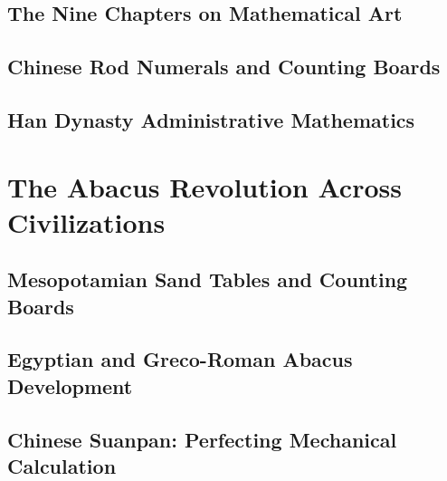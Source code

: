 \documentclass[12pt, oneside, openany]{book}
\let\oldchapter\chapter
\renewcommand{\chapter}{
	\cleardoublepage
	\thispagestyle{chapter}
	\oldchapter
}
\begin{document}
\section{The Nine Chapters on Mathematical Art}

\section{Chinese Rod Numerals and Counting Boards}

\section{Han Dynasty Administrative Mathematics}


\chapter{The Abacus Revolution Across Civilizations}

\section{Mesopotamian Sand Tables and Counting Boards}

\section{Egyptian and Greco-Roman Abacus Development}

\section{Chinese Suanpan: Perfecting Mechanical Calculation}
\end{document}
